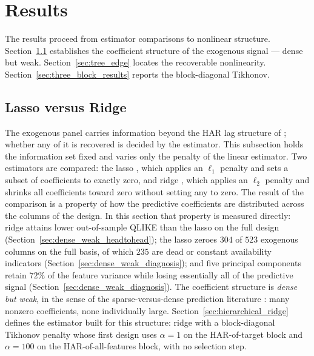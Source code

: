 \section{Results}
\label{sec:results}


The results proceed from estimator comparisons to
nonlinear structure.
Section~\ref{sec:dense_weak} establishes the coefficient structure of
the exogenous signal --- dense but weak.
Section~\ref{sec:tree_edge} locates the recoverable nonlinearity.
Section~\ref{sec:three_block_results} reports the block-diagonal Tikhonov.

\subsection{Lasso versus Ridge}
\label{sec:dense_weak}

The exogenous panel carries information beyond the HAR lag
structure of \citet{Corsi2009}; whether any of it is recovered is
decided by the estimator. This subsection holds the information set
fixed and varies only the penalty of the linear estimator. Two estimators are
compared: the lasso \citep{Tibshirani1996}, which applies an $\ell_1$ penalty
and sets a subset of coefficients to exactly zero, and ridge
\citep{HoerlKennard1970}, which applies an $\ell_2$ penalty and shrinks all
coefficients toward zero without setting any to zero. The result of the
comparison is a property of how the predictive coefficients are distributed
across the columns of the design. In this section that property is measured
directly: ridge attains lower out-of-sample QLIKE than the lasso on the
full design (Section~\ref{sec:dense_weak_headtohead}); the lasso zeroes
$304$ of $523$ exogenous columns on the full basis, of which $235$ are dead
or constant availability indicators
(Section~\ref{sec:dense_weak_diagnosis}); and five principal components
retain $72\%$ of the feature variance while losing essentially all of the
predictive signal (Section~\ref{sec:dense_weak_diagnosis}). The coefficient structure is
\emph{dense but weak}, in the sense of the sparse-versus-dense
prediction literature
\citep{GiannoneLenzaPrimiceri2021,KozakNagelSantosh2020,ShenXiu2025}:
many nonzero coefficients, none individually large. Section~\ref{sec:hierarchical_ridge}
defines the estimator built for this structure: ridge with a
block-diagonal Tikhonov penalty
whose first design uses $\alpha = 1$ on the HAR-of-target block and
$\alpha = 100$ on the HAR-of-all-features block, with no selection
step.

